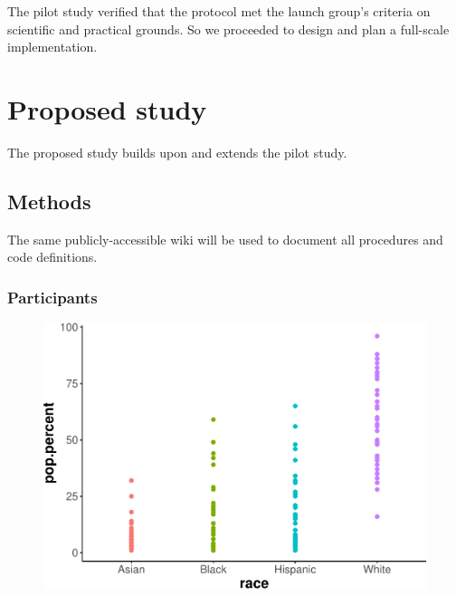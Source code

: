 \documentclass[english,man]{apa6}
\theoremstyle{definition}
\theoremstyle{definition}
\theoremstyle{definition}
\theoremstyle{remark}
\begin{document}
The pilot study verified that the protocol met the launch group's
criteria on scientific and practical grounds. So we proceeded to design
and plan a full-scale implementation.

\section{Proposed study}\label{proposed-study}

The proposed study builds upon and extends the pilot study.

\subsection{Methods}\label{methods-1}

The same publicly-accessible wiki \cite{PLAY-wiki} will be used to
document all procedures and code definitions.

\subsubsection{Participants}\label{participants-1}

\begin{figure}
\centering
\includegraphics{ibad-ms_files/figure-latex/PLAY-race-plot-1.pdf}
\caption{}
\end{figure}
\end{document}
